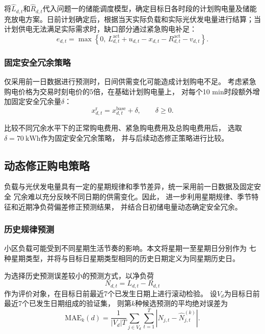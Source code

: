 将$\hat L_{d,t}$和$\hat R_{d,t}$代入问题一的储能调度模型，确定目标日各时段的计划购电量及储能充放电方案。日前计划确定后，根据当天实际负载和实际光伏发电量进行结算；当计划供电无法满足实际需求时，缺口部分通过紧急购电补足：
\begin{equation}
e_{d,t}
=
\max\left\{
0,\,
L_{d,t}^{\mathrm{act}}+u_{d,t}
-x_{d,t}-R_{d,t}^{\mathrm{act}}-v_{d,t}
\right\}.
\label{eq:p2_emergency}
\end{equation}


\subsubsection{固定安全冗余策略}

仅采用前一日数据进行预测时，日间供需变化可能造成计划购电不足。
考虑紧急购电价格为交易时刻电价的5倍，在基础计划购电量上，
对每个10 min时段额外增加固定安全冗余量$\delta$：
\begin{equation}
x_{d,t}^{\mathrm{r}}
=
x_{d,t}^{\mathrm{base}}+\delta,
\qquad \delta\geq0.
\label{eq:p2_fixed_reserve}
\end{equation}

比较不同冗余水平下的正常购电费用、紧急购电费用及总购电费用后，
选取$\delta=70\ \mathrm{kWh}$作为固定安全冗余策略，
并与后续动态修正策略进行比较。


\subsection{动态修正购电策略}

负载与光伏发电量具有一定的星期规律和季节差异，统一采用前一日数据及固定安全
冗余难以充分反映不同日期的供需变化。因此，
进一步利用星期规律、季节特征和近期净负荷偏差修正预测结果，
并结合日初储电量动态确定安全冗余。


\subsubsection{历史规律预测}

小区负载可能受到不同星期生活节奏的影响。本文将星期一至星期日分别作为
七种星期类型，并将与目标日星期类型相同的历史日期定义为同星期历史日。

为选择历史预测误差较小的预测方式，以净负荷
\[
N_{d,t}=L_{d,t}-R_{d,t}
\]
作为评价对象，在目标日前最近7个已发生日期上进行滚动检验。
设$V_d$为目标日前最近7个已发生日期组成的验证集，
则第$k$种候选预测的平均绝对误差为
\begin{equation}
\mathrm{MAE}_k(d)
=
\frac{1}{|V_d|T}
\sum_{j\in V_d}\sum_{t=1}^{T}
\left|
N_{j,t}-\hat N^{(k)}_{j,t}
\right|.
\label{eq:p2_mae}
\end{equation}

